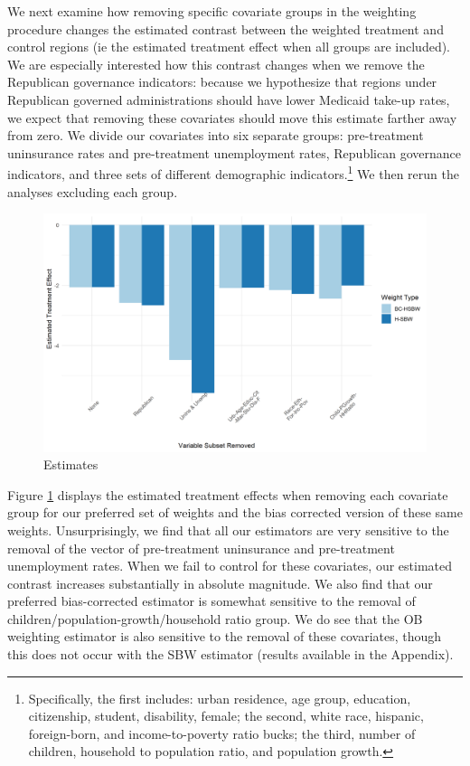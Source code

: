 \documentclass[12pt]{article}
\begin{document}
We next examine how removing specific covariate groups in the weighting procedure changes the estimated contrast between the weighted treatment and control regions (ie the estimated treatment effect when all groups are included). We are especially interested how this contrast changes when we remove the Republican governance indicators: because we hypothesize that regions under Republican governed administrations should have lower Medicaid take-up rates, we expect that removing these covariates should move this estimate farther away from zero. We divide our covariates into six separate groups: pre-treatment uninsurance rates and pre-treatment unemployment rates, Republican governance indicators, and three sets of different demographic indicators.\footnote{Specifically, the first includes: urban residence, age group, education, citizenship, student, disability, female; the second, white race, hispanic, foreign-born, and income-to-poverty ratio bucks; the third, number of children, household to population ratio, and population growth.} We then rerun the analyses excluding each group. 

\begin{figure}[]
\begin{center}
    \includegraphics[scale=0.6]{01_Plots/loo-covariates-main-c1.png}
    \caption{Estimates}
    \label{loocovariates}
\end{center}
\end{figure}

Figure \ref{loocovariates} displays the estimated treatment effects when removing each covariate group for our preferred set of weights and the bias corrected version of these same weights. Unsurprisingly, we find that all our estimators are very sensitive to the removal of the vector of pre-treatment uninsurance and pre-treatment unemployment rates. When we fail to control for these covariates, our estimated contrast increases substantially in absolute magnitude. We also find that our preferred bias-corrected estimator is somewhat sensitive to the removal of children/population-growth/household ratio group. We do see that the OB weighting estimator is also sensitive to the removal of these covariates, though this does not occur with the SBW estimator (results available in the Appendix). 
\end{document}
